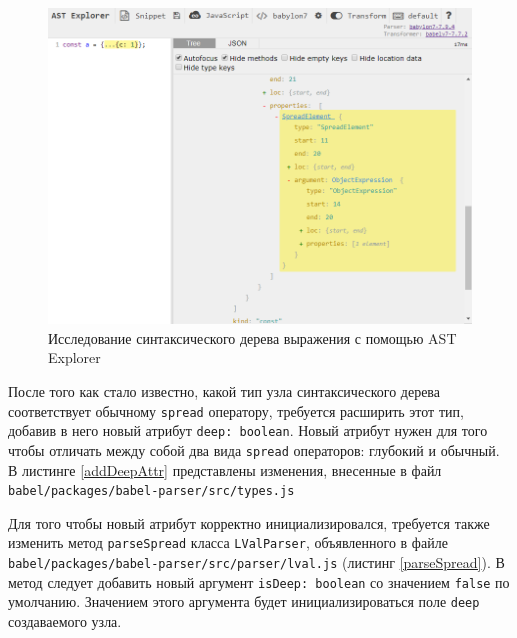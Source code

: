 \documentclass[14pt, a4paper]{article}
\def\code#1{\texttt{#1}} %
\begin{document}
\begin{figure}[h!]
  \centering
  \includegraphics[scale=0.7]{img/ast-explorer.png}
  \caption{Исследование синтаксического дерева выражения с помощью AST Explorer}
  \label{ast_explorer}
\end{figure}

После того как стало известно, какой тип узла синтаксического дерева соответствует обычному \code{spread}
оператору, требуется расширить этот тип, добавив в него новый атрибут \code{deep: boolean}. Новый атрибут
нужен для того чтобы отличать между собой два вида \code{spread} операторов: глубокий и обычный.
В листинге \ref{addDeepAttr} представлены изменения, внесенные в файл \code{babel/packages/babel-parser/src/types.js}



Для того чтобы новый атрибут корректно инициализировался, требуется также изменить метод \code{parseSpread} класса
\code{LValParser}, объявленного в файле \code{babel/packages/babel-parser/src/parser/lval.js} (листинг \ref{parseSpread}).
В метод следует добавить новый аргумент \code{isDeep: boolean} со значением \code{false} по умолчанию.
Значением этого аргумента будет инициализироваться поле \code{deep} создаваемого узла.


\end{document}
